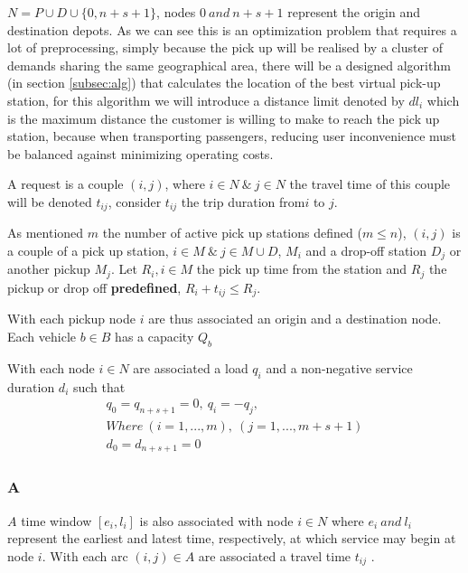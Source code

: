 \documentclass{article}
\begin{document}
$N = P \cup D \cup \{0, n + s + 1\}$, nodes $0 \ and \  n + s + 1$ represent the origin and destination depots.
\label{sec:walk_limit}
As we can see this is an optimization problem that requires a lot of preprocessing, simply because the pick up will be realised by a cluster of demands sharing the same geographical area, there will be a designed algorithm (in section \ref{subsec:alg})
that calculates the location of the best virtual pick-up station, for this algorithm we will introduce a distance limit denoted by $dl_i$ which is the maximum distance the customer is willing to make to reach the pick up station,  because when transporting passengers, reducing user inconvenience must be balanced against minimizing operating costs.

A request is a couple $(i,j)$, where $i \in N\  \& \  j \in N $ the travel time of this couple will be denoted $t_{ij}$,  consider $t_{ij}$ the trip duration from$i$ to $j$.

As mentioned $m$ the number of active pick up stations defined ($m \leqslant n$),  $(i,j)$ is a couple of a pick up station, $i \in M\ \& \ j \in M \cup D$, $M_i$ and a drop-off station $D_j$ or another pickup $M_j$.
Let $R_i, i \in M$ the pick up time from the station and $R_j$ the pickup or drop off \textbf{predefined}, $R_i + t_{ij} \leqslant R_j$.

With each pickup node $i$ are thus associated an origin and a destination node. Each vehicle $b \in B$ has a capacity $Q_b$


With each node $i \in N$ are associated a load $q_i$ and a non-negative service duration $d_i$ such that 
\begin{equation*}
\begin{array}{l}
q_0 = q_{n+s+1} = 0, \ q_i = - q_j,\\
Where \  (i = 1, . . . , m),\ (j = 1, ... , m+s+1) \\
d_0 = d_{n+s+1} = 0
\end{array}
\end{equation*}

\subsubsection*{A}

$A$ time window $[e_i, l_i]$ is also associated with node $i \in N$ where $ e_i\ and\ l_i$ represent the earliest and latest time,
respectively, at which service may begin at node $i$. With each arc $(i, j) \in A$ are associated a travel time $t_{ij}$ .
\end{document}
